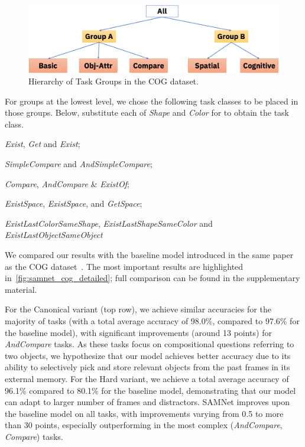 \begin{figure}[htbp]
	\centering
	\includegraphics[width=\columnwidth]{../img/architecture/hierarchy}
	\caption{Hierarchy of Task Groups in the COG dataset.}
	\label{fig:task-groups}
\end{figure}



For groups at the lowest level, we chose the following task classes to be placed in those groups.
Below, substitute each of \textit{Shape} and \textit{Color} for  \uX{} to obtain the task class.
\begin{description}
	\compresslist
	\item[Basic:] \textit{Exist}\uX, \textit{Get}\uX{} and \textit{Exist};
	\item[Obj-Attr:] \emph{SimpleCompare}\uX{} and \textit{AndSimpleCompare}\uX;
	\item[Compare:] \textit{Compare}\uX,  \textit{AndCompare}\uX{} \& \textit{Exist}\uX\textit{Of};
	\item[Spatial:] \textit{ExistSpace}, \textit{Exist}\uX\textit{Space}, and \textit{Get}\uX\textit{Space};
	\item[Cognitive:] \textit{ExistLastColorSameShape}, \textit{ExistLastShapeSameColor} and \textit{ExistLastObjectSameObject}
\end{description}


We compared our results with the baseline model introduced in the same paper as the COG dataset~\cite{yang2018dataset}.
The most important results are highlighted in~\cref{fig:samnet_cog_detailed}; full comparison can be found in the supplementary material.

For the Canonical variant (top row), we achieve similar accuracies for the majority of tasks (with a total average accuracy of 98.0\%, compared to 97.6\% for the baseline model), with significant improvements (around 13 points) for \textit{AndCompare} tasks.
As these tasks focus on compositional questions referring to two objects, we hypothesize that our model achieves better accuracy due to its ability to selectively pick and store relevant objects from the past frames in its external memory.
For the Hard variant, we achieve a total average accuracy of 96.1\% compared to 80.1\% for the baseline model, demonstrating that our model can adapt to larger number of frames and distractors.
SAMNet improves upon the baseline model on all tasks, with improvements varying from 0.5 to more than 30 points, especially outperforming in the most complex (\textit{AndCompare}\uX, \textit{Compare}\uX) tasks.


